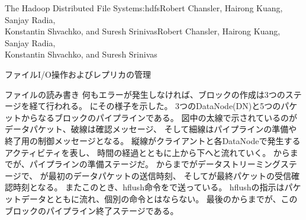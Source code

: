 \begin{aosachaptertoc}{The Hadoop Distributed File System}{s:hdfs}{Robert Chansler, Hairong Kuang, Sanjay Radia, \\ Konstantin Shvachko, and Suresh Srinivas}{Robert Chansler, Hairong Kuang, Sanjay Radia, \\ \hspace*{0.9cm} Konstantin Shvachko, and Suresh Srinivas}
\begin{aosasect1}{ファイルI/O操作およびレプリカの管理}
\begin{aosasect2}{ファイルの読み書き}
何もエラーが発生しなければ、ブロックの作成は3つのステージを経て行われる。
にその様子を示した。
3つのDataNode(DN)と5つのパケットからなるブロックのパイプラインである。
図中の太線で示されているのがデータパケット、破線は確認メッセージ、
そして細線はパイプラインの準備や終了用の制御メッセージとなる。
縦線がクライアントと各DataNodeで発生するアクティビティを表し、
時間の経過とともに上から下へと流れていく。
からまでが、パイプラインの準備ステージだ。
からまでがデータストリーミングステージで、
が最初のデータパケットの送信時刻、
そしてが最終パケットの受信確認時刻となる。
またこのとき、hflush命令をで送っている。
hflushの指示はパケットデータとともに流れ、個別の命令とはならない。
最後のからまでが、このブロックのパイプライン終了ステージである。


\end{aosasect2}
\end{aosasect1}
\end{aosachaptertoc}
